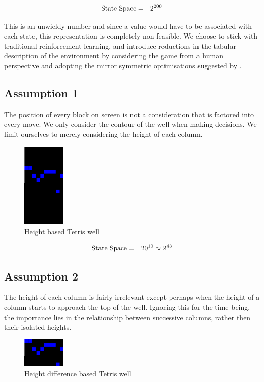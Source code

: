\documentclass{rucsthesis}
\begin{document}
\begin{eqnarray}
\centering
\textrm{State Space} & = & 2^{200} 
\end{eqnarray}

This is an unwieldy number and since a value would have to be associated with each state, this representation is completely non-feasible. We choose to stick with traditional reinforcement learning, and introduce reductions in the tabular description of the environment by considering the game from a human perspective and adopting the mirror symmetric optimisations suggested by \cite{yaeltetris}. 

\subsection*{Assumption 1}

The position of every block on screen is not a consideration that is factored into every move. We only consider the contour of the well when making decisions. We limit ourselves to merely considering the height of each column.

\begin{figure}[h]
\centering
\includegraphics[width=0.8in]{heightwell.png}
\caption{Height based Tetris well}
\label{fig:heightwell}
\end{figure}

\begin{eqnarray}
\centering
\textrm{State Space} & = & 20^{10} \approx 2^{43}
\end{eqnarray}

\subsection*{Assumption 2}

The height of each column is fairly irrelevant except perhaps when the height of a column starts to approach the top of the well. Ignoring this for the time being, the importance lies in the relationship between successive columns, rather then their isolated heights.

\begin{figure}[h]
\centering
\includegraphics[width=0.8in]{diffheightwell.png}
\caption{Height difference based Tetris well}
\label{fig:diffheightwell}
\end{figure}
\end{document}
